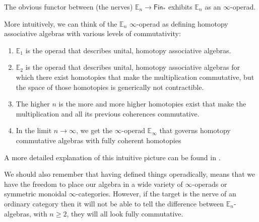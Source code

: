 \documentclass[../text]{subfiles}
\begin{document}
\begin{proposition}
    The obvious functor between (the nerves) $\mathbb{E}_n \rightarrow \mathsf{Fin}_*$ exhibits $\mathbb{E}_n$ as an $\infty$-operad.
\end{proposition}

More intuitively, we can think of the $\mathbb{E}_n$ $\infty$-operad as defining homotopy associative algebras with various levels of commutativity:
%
\begin{enumerate}
    \item $\mathbb{E}_1$ is the operad that describes unital, homotopy associative algebras.
    \item $\mathbb{E}_2$ is the operad that describes unital, homotopy associative algebras for which there exist homotopies that make the multiplication commutative, but the space of those homotopies is generically not contractible.
    \item The higher $n$ is the more and more higher homotopies exist that make the multiplication and all its previous coherences commutative.
    \item In the limit $n \rightarrow \infty$, we get the $\infty$-operad $\mathbb{E}_{\infty}$ that governs homotopy commutative algebras with fully coherent homotopies
\end{enumerate}

A more detailed explanation of this intuitive picture can be found in \cite{tanaka20}.

\begin{remark}
    We should also remember that having defined things operadically, means that we have the freedom to place our algebra in a wide variety of $\infty$-operads or symmetric monoidal $\infty$-categories. However, if the target is the nerve of an ordinary category then it will not be able to tell the difference between $\mathbb{E}_n$-algebras, with $n \geq 2$, they will all look fully commutative.
\end{remark}
\end{document}
